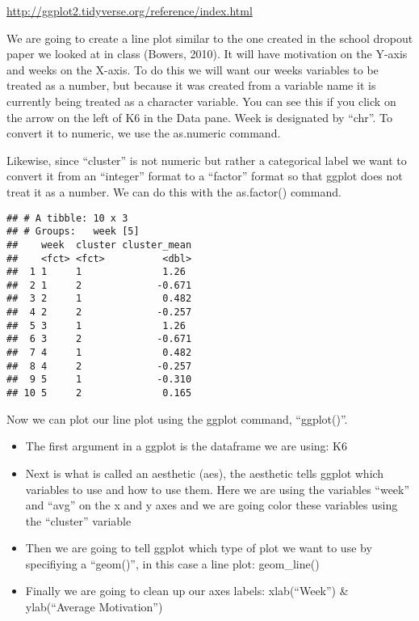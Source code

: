 \documentclass[]{article}
\newenvironment{Shaded}{\begin{snugshade}}{\end{snugshade}}
\newcommand{\KeywordTok}[1]{\textcolor[rgb]{0.13,0.29,0.53}{\textbf{#1}}}
\newcommand{\NormalTok}[1]{#1}
\newcommand{\OperatorTok}[1]{\textcolor[rgb]{0.81,0.36,0.00}{\textbf{#1}}}
\newcommand{\StringTok}[1]{\textcolor[rgb]{0.31,0.60,0.02}{#1}}
\providecommand{\tightlist}{%
  \setlength{\itemsep}{0pt}\setlength{\parskip}{0pt}}
\begin{document}
\url{http://ggplot2.tidyverse.org/reference/index.html}

We are going to create a line plot similar to the one created in the
school dropout paper we looked at in class (Bowers, 2010). It will have
motivation on the Y-axis and weeks on the X-axis. To do this we will
want our weeks variables to be treated as a number, but because it was
created from a variable name it is currently being treated as a
character variable. You can see this if you click on the arrow on the
left of K6 in the Data pane. Week is designated by ``chr''. To convert
it to numeric, we use the as.numeric command.

Likewise, since ``cluster'' is not numeric but rather a categorical
label we want to convert it from an ``integer'' format to a ``factor''
format so that ggplot does not treat it as a number. We can do this with
the as.factor() command.

\begin{Shaded}
\end{Shaded}

\begin{verbatim}
## # A tibble: 10 x 3
## # Groups:   week [5]
##    week  cluster cluster_mean
##    <fct> <fct>          <dbl>
##  1 1     1              1.26 
##  2 1     2             -0.671
##  3 2     1              0.482
##  4 2     2             -0.257
##  5 3     1              1.26 
##  6 3     2             -0.671
##  7 4     1              0.482
##  8 4     2             -0.257
##  9 5     1             -0.310
## 10 5     2              0.165
\end{verbatim}

Now we can plot our line plot using the ggplot command, ``ggplot()''.

\begin{itemize}
\tightlist
\item
  The first argument in a ggplot is the dataframe we are using: K6
\item
  Next is what is called an aesthetic (aes), the aesthetic tells ggplot
  which variables to use and how to use them. Here we are using the
  variables ``week'' and ``avg'' on the x and y axes and we are going
  color these variables using the ``cluster'' variable
\item
  Then we are going to tell ggplot which type of plot we want to use by
  specifiying a ``geom()'', in this case a line plot: geom\_line()
\item
  Finally we are going to clean up our axes labels: xlab(``Week'') \&
  ylab(``Average Motivation'')
\end{itemize}
\end{document}

